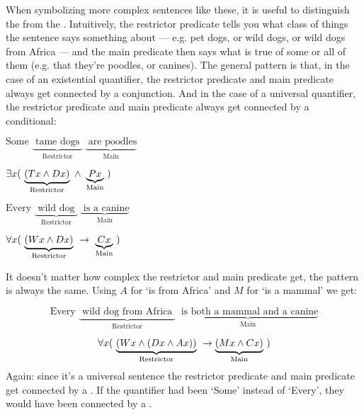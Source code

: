 When symbolizing more complex sentences like these, it is useful to distinguish the  from the .  Intuitively, the restrictor predicate tells you what class of things the sentence says something about --- e.g. pet dogs, or wild dogs, or wild dogs from Africa --- and the main predicate then says what is true of some or all of them (e.g. that they're poodles, or canines).  The general pattern is that, in the case of an existential quantifier, the restrictor predicate and main predicate always get connected by a conjunction.  And in the case of a universal quantifier, the restrictor predicate and main predicate always get connected by a conditional:

\begin{multicols}{2}
\begin{center}
$\text{Some }\underbrace{\text{ tame dogs }}_{\text{Restrictor}}\  \underbrace{\text{ are poodles}}_{\text{Main}}$

\vspace{1em}

$\exists x (\ \underbrace{(Tx \eand Dx)}_{\text{Restrictor}} \ \eand \ \underbrace{Px}_{\text{Main}} \ )$
\end{center}

\columnbreak

\begin{center}
$\text{Every }\underbrace{\text{ wild dog }}_{\text{Restrictor}} \ \underbrace{\text{ is a canine}}_{\text{Main}}$

\vspace{1em}

$\forall x( \ \underbrace{(Wx \eand Dx)}_{\text{Restrictor}} \ \eif \  \underbrace{Cx}_{\text{Main}} \ )$
\end{center}
\end{multicols}

It doesn't matter how complex the restrictor and main predicate get, the pattern is always the same.  Using $A$ for `\blank is from Africa' and $M$ for `\blank is a mammal' we get:

$$\text{Every }\underbrace{\text{ wild dog from Africa }}_{\text{Restrictor}} \ \underbrace{\text{ is both a mammal and a canine}}_{\text{Main}}$$

$$\forall x(\ \underbrace{(Wx \wedge (Dx \wedge Ax))}_{\text{Restrictor}} \ \rightarrow  \underbrace{(Mx \wedge Cx)}_{\text{Main}} \ )$$
Again: since it's a universal sentence the restrictor predicate and main predicate get connected by a \eif.  If the quantifier had been `Some' instead of `Every', they would have been connected by a \eand.

